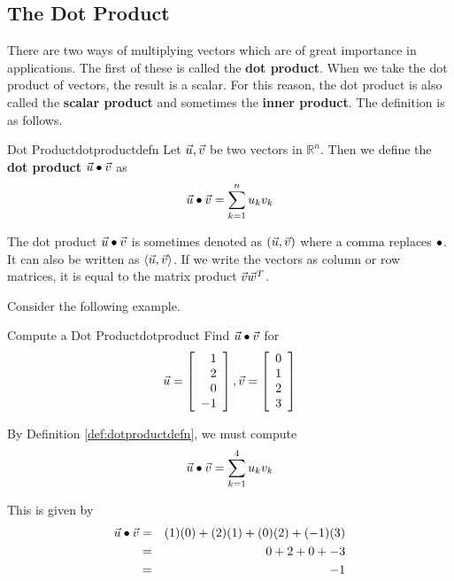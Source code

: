 \subsection{The Dot Product}

There are two ways of multiplying vectors which are of great importance in
applications. The first of these is called the \textbf{dot product}. When we take the dot product of vectors, the 
result is a scalar. For this reason, the dot product is also
called the \textbf{scalar product }and sometimes the \textbf{inner product}. The definition is as follows.

\begin{definition}{Dot Product}{dotproductdefn}
Let $\vec{u},\vec{v}$ be two vectors in $\mathbb{R}^{n}$. Then we
define the \textbf{dot product}  $\vec{u}\bullet \vec{v}$ as
\begin{equation*}
\vec{u}\bullet \vec{v} = \sum_{k=1}^{n}u_{k}v_{k}
\end{equation*}
\end{definition}

The dot product $\vec{u}\bullet \vec{v}$ is sometimes denoted as $(\vec{u},\vec{v})$ where a comma replaces $\bullet $. It can also be written
as $\left\langle \vec{u},\vec{v}\right\rangle $. If we write the vectors as column or row matrices, it
is equal to the matrix product $\vec{v}\vec{w}^{T}$.

Consider the following example.

\begin{example}{Compute a Dot Product}{dotproduct}
Find $\vec{u} \bullet \vec{v}$ for
\begin{equation*}
\vec{u}
=
\left[ 
\begin{array}{r}
1 \\
2 \\
0 \\
-1 
\end{array}
\right],
\vec{v}
=
\left[ 
\begin{array}{r}
0 \\
1 \\
2 \\
3
\end{array}
\right] 
\end{equation*}
\end{example}

\begin{solution}
By Definition \ref{def:dotproductdefn}, we must compute 
\begin{equation*}
\vec{u}\bullet \vec{v} = \sum_{k=1}^{4}u_{k}v_{k}
\end{equation*}

This is given by 
\begin{eqnarray*}
\vec{u} \bullet \vec{v}
&=&
(1)(0) + (2)(1) + (0)(2) + (-1)(3) \\
&=&
0 + 2 + 0 + -3 \\
&=&
-1
\end{eqnarray*}
\end{solution}

